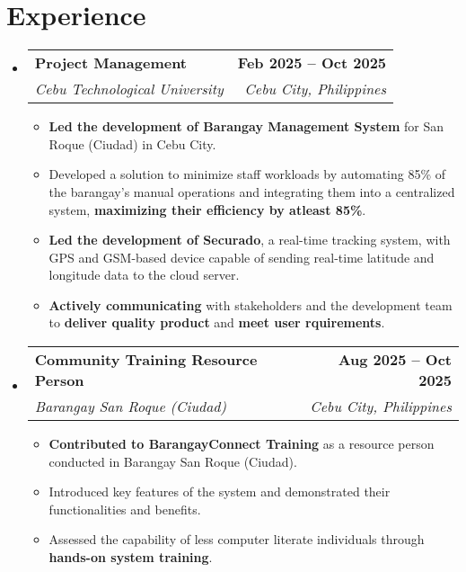 \documentclass[letterpaper,11pt]{article}
\makeatletter
\newcommand{\resumeItem}[1]{
  \item\small{
    {#1 \vspace{0pt}}
  }
}
\newcommand{\resumeSubheading}[4]{
  \vspace{-2pt}\item
    \begin{tabular*}{1.0\textwidth}[t]{l@{\extracolsep{\fill}}r}
      \textbf{#1} & \textbf{\small #2} \\
      \textit{\small#3} & \textit{\small #4} \\
    \end{tabular*}\vspace{-7pt}
}
\newcommand{\resumeSubHeadingListStart}{\begin{itemize}[leftmargin=0.0in, label={}]}
\newcommand{\resumeSubHeadingListEnd}{\end{itemize}}\vspace{0pt}
\newcommand{\resumeItemListStart}{\begin{itemize}}
\newcommand{\resumeItemListEnd}{\end{itemize}\vspace{-5pt}}
\makeatother
\begin{document}
\section{Experience}
    \resumeSubHeadingListStart
            \resumeSubheading{Project Management}{Feb 2025 -- Oct 2025}{Cebu Technological University}{Cebu City, Philippines} 
                \resumeItemListStart
                  \resumeItem{\textbf{Led the development of Barangay Management System} for San Roque (Ciudad) in Cebu City.}
                  \resumeItem{Developed a solution to  minimize staff workloads by automating 85\% of the barangay's manual operations and integrating them into a centralized system, \textbf{maximizing their efficiency by atleast 85\%}.}
                  \resumeItem{\textbf{Led the development of Securado}, a real-time tracking system, with GPS and GSM-based device capable of sending real-time latitude and longitude data to the cloud server.}
                  \resumeItem{\textbf{Actively communicating} with stakeholders and the development team to \textbf{deliver quality product} and \textbf{meet user rquirements}.}
                \resumeItemListEnd
            \resumeSubheading{Community Training Resource Person}{Aug 2025 -- Oct 2025}{Barangay San Roque (Ciudad)}{Cebu City, Philippines} 
                \resumeItemListStart
                  \resumeItem{\textbf{Contributed to BarangayConnect Training} as a resource person conducted in Barangay San Roque (Ciudad).}
                  \resumeItem{Introduced key features of the system and demonstrated their functionalities and benefits.}
                  \resumeItem{Assessed the capability of less computer literate individuals through \textbf{hands-on system training}.}
                \resumeItemListEnd

    \resumeSubHeadingListEnd
    \vspace{-12pt}

\end{document}
